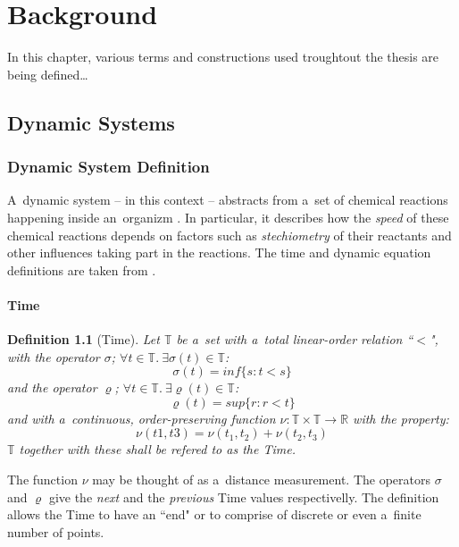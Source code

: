 \documentclass[12pt,oneside,draft]{fithesis}
\newcommand{\mReal}{\mathbb{R}}
\newcommand{\mTime}{\mathbb{T}}
\newtheorem{mydef}{Definition}
\begin{document}
\FrontMatter
\ThesisTitlePage

\begin{ThesisDeclaration}
\DeclarationText
\AdvisorName
\end{ThesisDeclaration}




\MainMatter
\tableofcontents
\chapter{Background}
In this chapter, various terms and constructions used troughtout the
thesis are being defined\dots
\section{Dynamic Systems}
\subsection{Dynamic System Definition}
A~dynamic system -- in this context -- abstracts from
a~set of chemical reactions happening inside an~organizm \cite{sven}.
In particular, it describes how the \emph{speed} of these chemical
reactions depends on factors such as \emph{stechiometry} of their
reactants and other influences taking part in the reactions.
The time and dynamic equation definitions are taken from
\cite{pospisil}.
\subsubsection{Time}
\begin{mydef}[Time]
Let $\mTime$ be a~set with a~total linear-order relation ``$<$",
with the operator $\sigma$; $\forall t \in \mTime{}.\:\exists
\sigma{}(t) \in \mTime$:
	\begin{equation}
		\sigma{}(t) = inf\{s : t < s\}
	\end{equation}
and the operator $\varrho$; $\forall t \in \mTime{}.\:\exists
\varrho{}(t) \in \mTime$:
	\begin{equation}
		\varrho{}(t) = sup\{r : r < t\}
	\end{equation}
and with a~continuous, order-preserving function
	$\nu: \mTime \times \mTime \rightarrow \mReal$
with the property:
	\begin{equation}
		\nu{}(t1, t3) = \nu{}(t_1, t_2) + \nu{}(t_2, t_3)
	\end{equation}
$\mTime$ together with these shall be refered to as the \emph{Time}.
\end{mydef}
The function $\nu$ may be thought of as a~distance measurement.
The operators $\sigma$ and $\varrho$ give the \emph{next} and the
\emph{previous}
Time values respectivelly. The definition allows the Time
to have an ``end" or to comprise of discrete or even
a~finite number of points.
\end{document}
